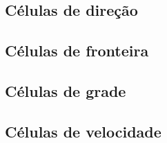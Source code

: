 \subsection{Células de direção}

\subsection{Células de fronteira}

\subsection{Células de grade}

\subsection{Células de velocidade}





